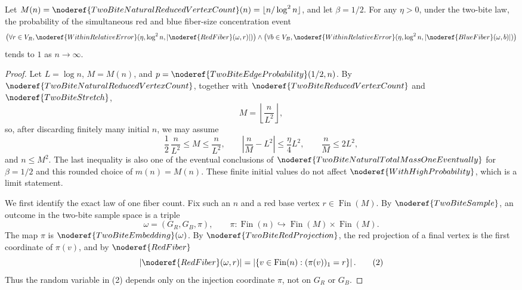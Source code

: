 \begin{lemma}
Let \(M(n)=\noderef{TwoBiteNaturalReducedVertexCount}(n) = \lfloor n/\log^2 n \rfloor\), and let \(\beta = 1/2\). For any \(\eta>0\), under the two-bite law, the probability of the simultaneous red and blue fiber-size concentration event
\[
\big(\forall r\in V_R, \noderef{WithinRelativeError}(\eta, \log^2 n, |\noderef{RedFiber}(\omega,r)|)\big) \land
\big(\forall b\in V_B, \noderef{WithinRelativeError}(\eta, \log^2 n, |\noderef{BlueFiber}(\omega,b)|)\big)
\]
tends to \(1\) as \(n\to\infty\).
\end{lemma}
\begin{proof}
Let \(L=\log n\), \(M=M(n)\), and
\(p=\noderef{TwoBiteEdgeProbability}(1/2,n)\).  By
\(\noderef{TwoBiteNaturalReducedVertexCount}\), together with
\(\noderef{TwoBiteReducedVertexCount}\) and \(\noderef{TwoBiteStretch}\),
\[
M=\left\lfloor \frac n{L^2}\right\rfloor ,
\]
so, after discarding finitely many initial \(n\), we may assume
\[
\frac12\,\frac n{L^2}\le M\le \frac n{L^2},\qquad
\left|\frac nM-L^2\right|\le \frac{\eta}{4}L^2,\qquad
\frac nM\le 2L^2,
\tag{1}
\]
and \(n\le M^2\).  The last inequality is also one of the eventual
conclusions of \(\noderef{TwoBiteNaturalTotalMassOneEventually}\) for
\(\beta=1/2\) and this rounded choice of \(m(n)=M(n)\).  These finite
initial values do not affect \(\noderef{WithHighProbability}\), which is a
limit statement.

We first identify the exact law of one fiber count.  Fix such an \(n\) and a
red base vertex \(r\in \operatorname{Fin}(M)\).  By
\(\noderef{TwoBiteSample}\), an outcome in the two-bite sample space is a
triple
\[
\omega=(G_R,G_B,\pi),
\qquad
\pi:\operatorname{Fin}(n)\hookrightarrow \operatorname{Fin}(M)\times
\operatorname{Fin}(M).
\]
The map \(\pi\) is \(\noderef{TwoBiteEmbedding}(\omega)\).  By
\(\noderef{TwoBiteRedProjection}\), the red projection of a final vertex is
the first coordinate of \(\pi(v)\), and by \(\noderef{RedFiber}\)
\[
|\noderef{RedFiber}(\omega,r)|
=\left|\{v\in \operatorname{Fin}(n):(\pi(v))_1=r\}\right|.
\tag{2}
\]
Thus the random variable in (2) depends only on the injection coordinate
\(\pi\), not on \(G_R\) or \(G_B\).


\end{proof}
